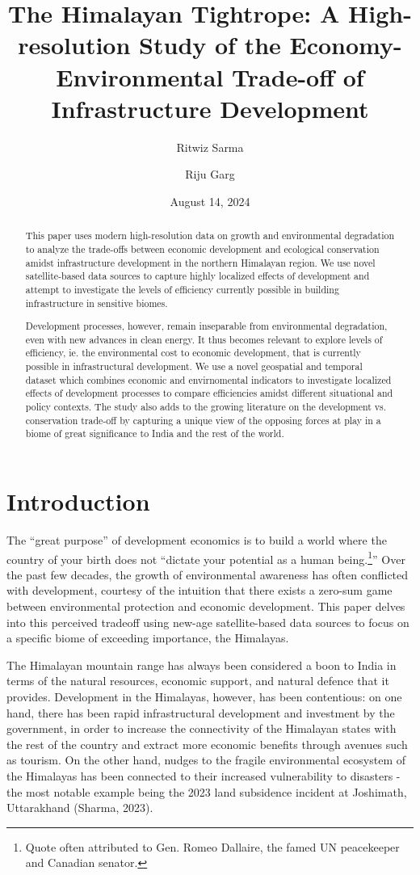 \documentclass{article}
\title{The Himalayan Tightrope: A High-resolution Study of the Economy-Environmental Trade-off of Infrastructure Development}
\author[1]{Ritwiz Sarma}
\author[2]{Riju Garg}
\affil[1,2]{Madras School of Economics}
\date{August 14, 2024}
\begin{document}
\maketitle

\begin{abstract}

    This paper uses modern high-resolution data on growth and environmental degradation to analyze the trade-offs between economic development and ecological conservation amidst infrastructure development in the northern Himalayan region. We use novel satellite-based data sources to capture highly localized effects of development and attempt to investigate the levels of efficiency currently possible in building infrastructure in sensitive biomes.

    Development processes, however, remain inseparable from environmental degradation, even with new advances in clean energy. It thus becomes relevant to explore levels of efficiency, ie. the environmental cost to economic development, that is currently possible in infrastructural development. We use a novel geospatial and temporal dataset which combines economic and envirnomental indicators to investigate localized effects of development processes to compare efficiencies amidst different situational and policy contexts. The study also adds to the growing literature on the development vs. conservation trade-off by capturing a unique view of the opposing forces at play in a biome of great significance to India and the rest of the world.

\end{abstract}


\section{Introduction}

The “great purpose” of development economics is to build a world where the country of your birth does not “dictate your potential as a human being.\footnote[1]{Quote often attributed to Gen. Romeo Dallaire, the famed UN peacekeeper and Canadian senator.}”  Over the past few decades, the growth of environmental awareness has often conflicted with development, courtesy of the intuition that there exists a zero-sum game between environmental protection and economic development. This paper delves into this perceived tradeoff using new-age satellite-based data sources to focus on a specific biome of exceeding importance, the Himalayas.

The Himalayan mountain range has always been considered a boon to India in terms of the natural resources, economic support, and natural defence that it provides. Development in the Himalayas, however, has been contentious: on one hand, there has been rapid infrastructural development and investment by the government, in order to increase the connectivity of the Himalayan states with the rest of the country and extract more economic benefits through avenues such as tourism. On the other hand, nudges to the fragile environmental ecosystem of the Himalayas has been connected to their increased vulnerability to disasters - the most notable example being the 2023 land subsidence incident at Joshimath, Uttarakhand (Sharma, 2023).
\end{document}
